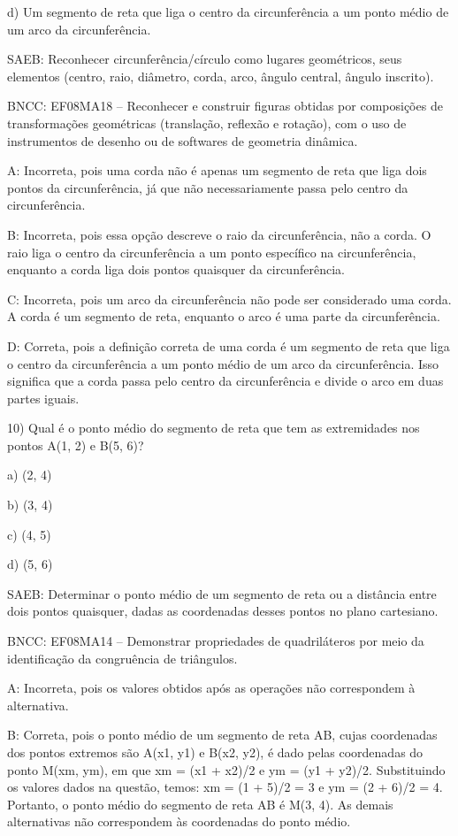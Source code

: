 d) Um segmento de reta que liga o centro da circunferência a um ponto
médio de um arco da circunferência.

SAEB: Reconhecer circunferência/círculo como lugares geométricos, seus
elementos (centro, raio, diâmetro, corda, arco, ângulo central, ângulo
inscrito).

BNCC: EF08MA18 -- Reconhecer e construir figuras obtidas por composições
de transformações geométricas (translação, reflexão e rotação), com o
uso de instrumentos de desenho ou de softwares de geometria dinâmica.

A: Incorreta, pois uma corda não é apenas um segmento de reta que liga
dois pontos da circunferência, já que não necessariamente passa pelo
centro da circunferência.

B: Incorreta, pois essa opção descreve o raio da circunferência, não a
corda. O raio liga o centro da circunferência a um ponto específico na
circunferência, enquanto a corda liga dois pontos quaisquer da
circunferência.

C: Incorreta, pois um arco da circunferência não pode ser considerado
uma corda. A corda é um segmento de reta, enquanto o arco é uma parte da
circunferência.

D: Correta, pois a definição correta de uma corda é um segmento de reta
que liga o centro da circunferência a um ponto médio de um arco da
circunferência. Isso significa que a corda passa pelo centro da
circunferência e divide o arco em duas partes iguais.

10) Qual é o ponto médio do segmento de reta que tem as extremidades nos
pontos A(1, 2) e B(5, 6)?

a) (2, 4)

b) (3, 4)

c) (4, 5)

d) (5, 6)

SAEB: Determinar o ponto médio de um segmento de reta ou a distância
entre dois pontos quaisquer, dadas as coordenadas desses pontos no plano
cartesiano.

BNCC: EF08MA14 -- Demonstrar propriedades de quadriláteros por meio da
identificação da congruência de triângulos.

A: Incorreta, pois os valores obtidos após as operações não correspondem
à alternativa.

B: Correta, pois o ponto médio de um segmento de reta AB, cujas
coordenadas dos pontos extremos são A(x1, y1) e B(x2, y2), é dado pelas
coordenadas do ponto M(xm, ym), em que xm = (x1 + x2)/2 e ym = (y1 +
y2)/2. Substituindo os valores dados na questão, temos: xm = (1 + 5)/2 =
3 e ym = (2 + 6)/2 = 4. Portanto, o ponto médio do segmento de reta AB é
M(3, 4). As demais alternativas não correspondem às coordenadas do ponto
médio.

